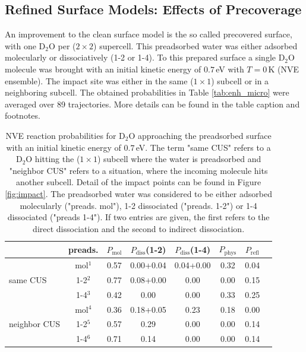 \documentclass[11pt,DIV=13,BCOR=5mm,a4paper,headinclude]{scrbook}
\begin{document}
\subsection{Refined Surface Models: Effects of Precoverage}
An improvement to the clean surface model is the so called precovered surface, with one D$_2$O per ($2\times 2$) supercell.
This preadsorbed water was either adsorbed molecularly or dissociatively (1-2 or 1-4).
To this prepared surface a single D$_2$O molecule was brought with an initial kinetic energy of $0.7\,$eV with $T=0\,$K  (NVE ensemble).
The impact site was either in the same ($1\times 1$) subcell or in a neighboring subcell.
The obtained probabilities in Table \ref{tab:enh_micro} were averaged over 89 trajectories.
More details can be found in the table caption and footnotes.
\\
\begin{table}[hbt]
 \centering
  \caption{NVE reaction probabilities for D$_2$O approaching the preadsorbed surface with an initial kinetic energy of $0.7\,$eV.
The term "same CUS" refers to a D$_2$O hitting the ($1\times 1$) subcell where the water is preadsorbed and "neighbor CUS" refers to a situation, where the incoming molecule hits another subcell.
Detail of the impact points can be found in Figure \ref{fig:impact}.
The preadsorbed water was considered to be either adsorbed molecularly ("preads. mol"), 1-2 dissociated ("preads. 1-2") or 1-4 dissociated ("preads 1-4").
If two entries are given, the first refers to the direct dissociation and the second to indirect dissociation.
}
 \begin{tabular}{l|c|cccccc}
\toprule
& preads. &$P_\textrm{mol}$ & $P_\textrm{diss}$(1-2) &  $P_\textrm{diss}$(1-4) & $P_\textrm{phys}$ & $P_\textrm{refl}$ \\\midrule
\multirow{3}{*}{same CUS}& mol$^1$ &0.57 &0.00+0.04 &0.04+0.00  &0.32 &0.04 \\
& 1-2$^2$ &0.77 &0.08+0.00 &0.00 &0.00 &0.15 \\
& 1-4$^3$ &0.42 &0.00 &0.00 &0.33 &0.25 \\\hline
\multirow{3}{*}{neighbor CUS}& mol$^4$ &0.36 &0.18+0.05 &0.23 &0.18 & 0.00  \\
& 1-2$^5$ &0.57 &0.29 & 0.00  &0.00 &0.14 \\
& 1-4$^6$ &0.71 &0.14 &0.00 & 0.00 & 0.14 \\\bottomrule
\end{tabular}

\end{table}
\end{document}
